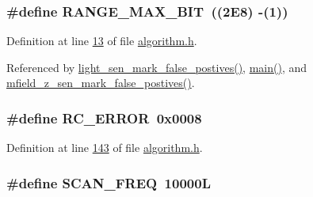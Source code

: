 \hypertarget{a00021_ae0c75a1cb44e5d3f00ec7c9e40acfda8}{
\subsubsection[{R\+A\+N\+G\+E\+\_\+\+M\+A\+X\+\_\+8\+B\+I\+T}]{\setlength{\rightskip}{0pt plus 5cm}\#define R\+A\+N\+G\+E\+\_\+\+M\+A\+X\+\_\+B\+I\+T~((2\+E8)  -\/(1))}}\label{a00021_ae0c75a1cb44e5d3f00ec7c9e40acfda8}


Definition at line \hyperlink{a00021_source_l00013}{13} of file \hyperlink{a00021_source}{algorithm.\+h}.



Referenced by \hyperlink{a00047_source_l00491}{light\+\_\+sen\+\_\+mark\+\_\+false\+\_\+postives()}, \hyperlink{a00048_source_l00080}{main()}, and \hyperlink{a00053_source_l00747}{mfield\+\_\+z\+\_\+sen\+\_\+mark\+\_\+false\+\_\+postives()}.

\hypertarget{a00021_a993a04d3d34ab3326d1786c66e3aaa1a}{
\subsubsection[{R\+C\+\_\+\+E\+R\+R\+O\+R}]{\setlength{\rightskip}{0pt plus 5cm}\#define R\+C\+\_\+\+E\+R\+R\+O\+R~0x0008}}\label{a00021_a993a04d3d34ab3326d1786c66e3aaa1a}


Definition at line \hyperlink{a00021_source_l00143}{143} of file \hyperlink{a00021_source}{algorithm.\+h}.

\hypertarget{a00021_a8127170b687c1f67a968886c128e76e4}{
\subsubsection[{S\+C\+A\+N\+\_\+\+F\+R\+E\+Q}]{\setlength{\rightskip}{0pt plus 5cm}\#define S\+C\+A\+N\+\_\+\+F\+R\+E\+Q~10000\+L}}\label{a00021_a8127170b687c1f67a968886c128e76e4}


